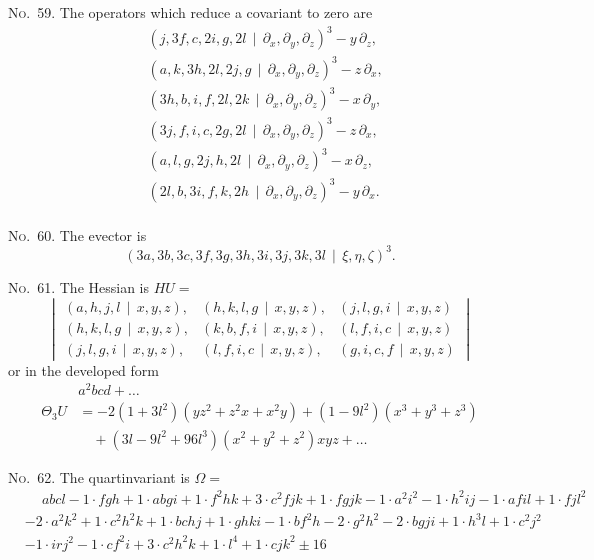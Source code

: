 \documentclass[11pt,a4paper]{book}
\begin{document}
\begin{center}
\noindent\textsc{No.~59.} The operators which reduce a covariant to zero are
\begin{align*}
&(j, 3f, c, 2i, g, 2l \, \mid\, \partial_x, \partial_y, \partial_z)^3 - y\,\partial_z,\\
&(a, k, 3h, 2l, 2j, g \, \mid\, \partial_x, \partial_y, \partial_z)^3 - z\,\partial_x,\\
&(3h, b, i, f, 2l, 2k \, \mid\, \partial_x, \partial_y, \partial_z)^3 - x\,\partial_y,\\
&(3j, f, i, c, 2g, 2l \, \mid\, \partial_x, \partial_y, \partial_z)^3 - z\,\partial_x,\\
&(a, l, g, 2j, h, 2l \, \mid\, \partial_x, \partial_y, \partial_z)^3 - x\,\partial_z,\\
&(2l, b, 3i, f, k, 2h \, \mid\, \partial_x, \partial_y, \partial_z)^3 - y\,\partial_x.\\
\end{align*}

\noindent\textsc{No.~60.} The evector is
\[(3a, 3b, 3c, 3f, 3g, 3h, 3i, 3j, 3k, 3l \, \mid\, \xi, \eta, \zeta)^3.\]

\noindent\textsc{No.~61.} The Hessian is $HU =$
\[
\begin{vmatrix}
(a, h, j, l \, \mid\, x, y, z), & (h, k, l, g \, \mid\, x, y, z), & (j, l, g, i \, \mid\, x, y, z) \\
(h, k, l, g \, \mid\, x, y, z), & (k, b, f, i \, \mid\, x, y, z), & (l, f, i, c \, \mid\, x, y, z) \\
(j, l, g, i \, \mid\, x, y, z), & (l, f, i, c \, \mid\, x, y, z), & (g, i, c, f \, \mid\, x, y, z)
\end{vmatrix}
\]
or in the developed form
\begin{align*}
&a^2bcd + \ldots \\
\Theta_3 U &= -2(1 + 3l^2)(yz^2 + z^2x + x^2y) + (1 - 9l^2)(x^3 + y^3 + z^3)\\
&\quad + (3l - 9l^2 + 96l^3)(x^2 + y^2 + z^2)xyz + \ldots
\end{align*}

\clearpage
\noindent\textsc{No.~62.} The quartinvariant is $\Omega =$
\begin{align*}
&\phantom{+} abcl - 1\cdot fgh + 1\cdot abgi + 1\cdot f^2hk + 3\cdot c^2fjk + 1\cdot fgjk - 1\cdot a^2i^2 - 1\cdot h^2ij - 1\cdot afil + 1\cdot fjl^2\\
& - 2\cdot a^2k^2 + 1\cdot c^2h^2k + 1\cdot bchj + 1\cdot ghki - 1\cdot bf^2h - 2\cdot g^2h^2 - 2\cdot bgji + 1\cdot h^3l + 1\cdot c^2j^2\\
& - 1\cdot irj^2 - 1\cdot cf^2i + 3\cdot c^2h^2k + 1\cdot l^4 + 1\cdot cjk^2 \pm 16
\end{align*}


\end{center}
\end{document}
